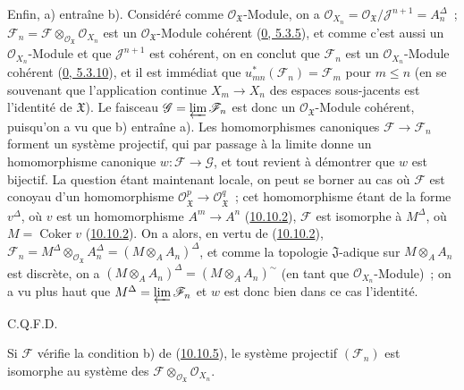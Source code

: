 
Enfin, a) entraîne b). Considéré comme
$\mathscr{O}_{\mathfrak{X}}$-Module, on a
$\mathscr{O}_{X_n}=\mathscr{O}_{\mathfrak{X}}/
\mathscr{J}^{n+1}=A_n^\Delta$~; $\mathscr{F}_n=\mathscr{F}
\otimes_{\mathscr{O}_{\mathfrak{X}}}\mathscr{O}_{X_n}$ est un
$\mathscr{O}_{\mathfrak{X}}$-Module cohérent
(\hyperref[0.5.3.5-fr]{0, 5.3.5}), et comme c'est aussi un
$\mathscr{O}_{X_n}$-Module et que $\mathscr{J}^{n+1}$ est cohérent,
on en conclut que $\mathscr{F}_n$ est un
$\mathscr{O}_{X_n}$-Module cohérent
(\hyperref[0.5.3.10-fr]{0, 5.3.10}), et il est immédiat que
$u_{mn}^*(\mathscr{F}_n)=\mathscr{F}_m$ pour $m\leq n$ (en se
souvenant que l'application continue $X_m\to X_n$ des espaces
sous-jacents est l'identité de $\mathfrak{X}$). Le faisceau
$\mathscr{G}=\varprojlim\mathscr{F}_n$ est donc un
$\mathscr{O}_{\mathfrak{X}}$-Module cohérent, puisqu'on a vu que b)
entraîne a). Les homomorphismes canoniques
$\mathscr{F}\to\mathscr{F}_n$ forment un système projectif, qui par
passage à la limite donne un homomorphisme canonique
$w:\mathscr{F}\to\mathscr{G}$, et tout revient à démontrer que $w$ est
bijectif. La question étant maintenant locale, on peut se borner au cas
où $\mathscr{F}$ est conoyau d'un homomorphisme
$\mathscr{O}_{\mathfrak{X}}^p\to\mathscr{O}_{\mathfrak{X}}^q$~; cet
homomorphisme étant de la forme $v^\Delta$, où $v$ est un homomorphisme
$A^m\to A^n$ (\hyperref[I.10.10.2-fr]{10.10.2}), $\mathscr{F}$ est
isomorphe à $M^\Delta$, où $M=\operatorname{Coker}v$
(\hyperref[I.10.10.2-fr]{10.10.2}). On a alors, en vertu de
(\hyperref[I.10.10.2-fr]{10.10.2}),
$\mathscr{F}_n=M^\Delta\otimes_{\mathscr{O}_{\mathfrak{X}}}A_n^\Delta
=(M\otimes_A A_n)^\Delta$, et comme la topologie $\mathfrak{J}$-adique
sur $M\otimes_A A_n$ est discrète, on a
$(M\otimes_A A_n)^\Delta=(M\otimes_A A_n)^{\sim}$ (en tant que
$\mathscr{O}_{X_n}$-Module)~; on a vu plus haut que
$M^\Delta=\varprojlim\mathscr{F}_n$ et $w$ est donc bien dans ce cas
l'identité.
\par\hfill C.Q.F.D.\par

\begin{corollary}[10.10.6]
\label{I.10.10.6-fr}
Si $\mathscr{F}$ vérifie la condition b) de
(\hyperref[I.10.10.5-fr]{10.10.5}), le système projectif
$(\mathscr{F}_n)$ est isomorphe au système des
$\mathscr{F}\otimes_{\mathscr{O}_{\mathfrak{X}}}\mathscr{O}_{X_n}$.
\end{corollary}

